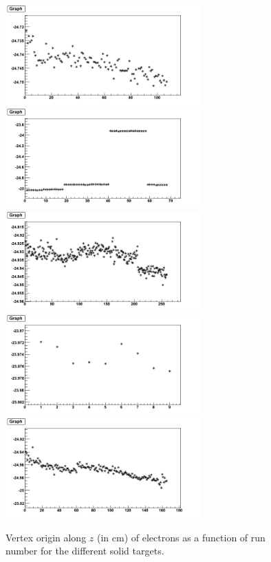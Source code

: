 \begin{figure}[tbp]
\centering
\includegraphics[width=7.5cm] {answer-fig/VertexC.png} 
\includegraphics[width=7.5cm] {answer-fig/VertexAl.png} 
\includegraphics[width=7.5cm] {answer-fig/VertexFe.png} 
\includegraphics[width=7.5cm] {answer-fig/VertexSn.png} 
\includegraphics[width=7.5cm] {answer-fig/VertexPb.png} 
\caption {Vertex origin along $z$ (in cm) of electrons as a function of run 
number for the different solid targets.}
\label{VertexSolid}
\end{figure}

